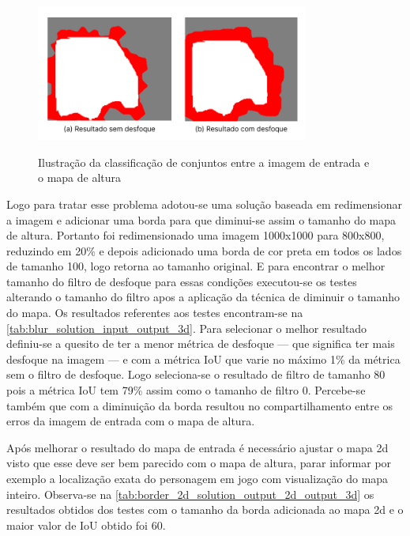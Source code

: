 

\begin{figure}[!ht]
	\centering
    \caption{Ilustração da classificação de conjuntos entre a imagem de entrada e o mapa de altura}
	\includegraphics[width=0.8\textwidth]{figures/comparacao_blur.png}
	\label{fig:comparando_blur}
\end{figure}

Logo para tratar esse problema adotou-se uma solução baseada em redimensionar a imagem e adicionar uma borda para que diminui-se assim o tamanho do mapa de altura. Portanto foi redimensionado uma imagem 1000x1000 para 800x800, reduzindo em 20\% e depois adicionado uma borda de cor preta em todos os lados de tamanho 100, logo retorna ao tamanho original. E para encontrar o melhor tamanho do filtro de desfoque para essas condições executou-se os testes alterando o tamanho do filtro apos a aplicação da técnica de diminuir o tamanho do mapa. Os resultados referentes aos testes encontram-se na \cref{tab:blur_solution_input_output_3d}. Para selecionar o melhor resultado definiu-se a quesito de ter a menor métrica de desfoque — que significa ter mais desfoque na imagem — e com a métrica IoU que varie no máximo 1\% da métrica sem o filtro de desfoque. Logo seleciona-se o resultado de filtro de tamanho 80 pois a métrica IoU tem 79\% assim como o tamanho de filtro 0. Percebe-se também que com a diminuição da borda resultou no compartilhamento entre os erros da imagem de entrada com o mapa de altura.



Após melhorar o resultado do mapa de entrada é necessário ajustar o mapa 2d visto que esse deve ser bem parecido com o mapa de altura, parar informar por exemplo a localização exata do personagem em jogo com visualização do mapa inteiro. Observa-se na \cref{tab:border_2d_solution_output_2d_output_3d} os resultados obtidos dos testes com o tamanho da borda adicionada ao mapa 2d e o maior valor de IoU obtido foi 60.

